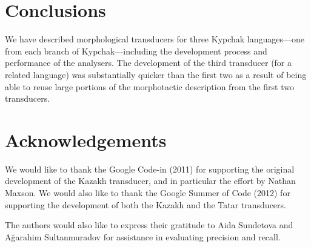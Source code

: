 \documentclass[a4paper,11pt,twocolumn]{article}
\begin{document}
\section{Conclusions}\label{sec:conclusions}

We have described morphological transducers for three Kypchak languages---one from each branch of Kypchak---including the development process and performance of the analysers. The development of the third transducer (for a related language) was substantially quicker than the first two as a result of being able to reuse large portions of the morphotactic description from the first two transducers.

\section*{Acknowledgements}

We would like to thank the Google Code-in (2011) for supporting the original development 
of the Kazakh transducer, and in particular the effort by Nathan Maxson. We 
would also like to thank the Google Summer of Code (2012) for supporting the 
development of both the Kazakh and the Tatar transducers. 

The authors would also like to express their gratitude to Aida Sundetova 
and Ağarahim Sultanmuradov
for assistance in evaluating precision and recall.




\appendix 
\end{document}
